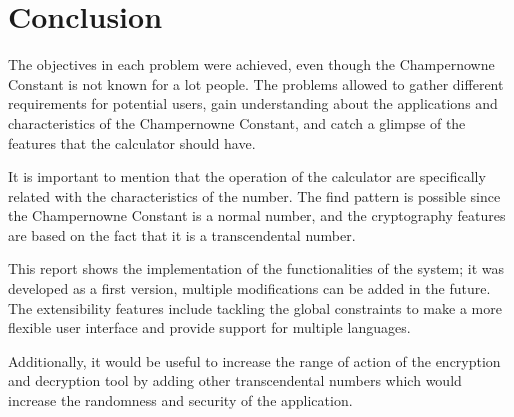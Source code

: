 \documentclass{report}
\begin{document}
\chapter{Conclusion}

The objectives in each problem were achieved, even though the Champernowne Constant is not known for a lot people. The problems allowed to gather different requirements for potential users, gain understanding about the applications and characteristics of the Champernowne Constant, and catch a glimpse of the features that the calculator should have.

It is important to mention that the operation of the calculator are specifically related with the characteristics of the number. The find pattern is possible since the Champernowne Constant is a normal number, and the cryptography features are based on the fact that it is a transcendental number.

This report shows the implementation of the functionalities of the system; it was developed as a first version, multiple modifications can be added in the future. The extensibility features include tackling the global constraints to make a more flexible user interface and provide support for multiple languages.

Additionally, it would be useful to increase the range of action of the encryption and decryption tool by adding other transcendental numbers which would increase the randomness and security of the application. 
\end{document}
